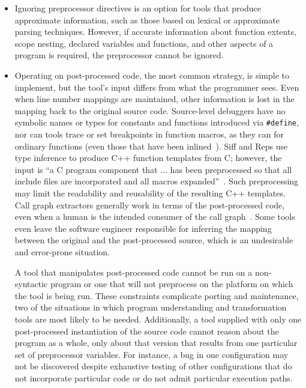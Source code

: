 \documentclass[10pt]{article}
\begin{document}
\begin{itemize}

\item Ignoring preprocessor directives is an option for tools that produce
  approximate information, such as those based on lexical or approximate
  parsing techniques.  However, if accurate information about function
  extents, scope nesting, declared variables and functions, and other
  aspects of a program is required, the preprocessor cannot be ignored.

\item Operating on post-processed code, the most common strategy, is
  simple to implement, but the tool's input differs from what the
  programmer sees.  Even when line number mappings are maintained, other
  information is lost in the mapping back to the original source code.
  Source-level debuggers have no symbolic names or types for constants and
  functions introduced via {\tt \#define}, nor can tools trace or set
  breakpoints in function macros, as they can for ordinary functions (even
  those that have been inlined~\cite{Zellweger83:TR}).  Siff and Reps use
  type inference to produce C++ function templates from C; however, the
  input is ``a C program component that $\ldots$ has been preprocessed so
  that all include files are incorporated and all macros
  expanded''~\cite[p.~145]{Siff-fse96}.  Such preprocessing may limit the
  readability and reusability of the resulting C++ templates.  Call graph
  extractors generally work in terms of the post-processed code, even when
  a human is the intended consumer of the call graph~\cite{Murphy-icse18}.
  Some tools even leave the software engineer responsible for inferring the
  mapping between the original and the post-processed source, which is an
  undesirable and error-prone situation.
  
  A tool that manipulates post-processed code cannot be run on a
  non-syntactic program or one that will not preprocess on the platform on
  which the tool is being run.  These constraints complicate porting and
  maintenance, two of the situations in which program understanding and
  transformation tools are most likely to be needed.  Additionally, a tool
  supplied with only one post-processed instantiation of the source code
  cannot reason about the program as a whole, only about that version that
  results from one particular set of preprocessor variables.  For instance,
  a bug in one configuration may not be discovered despite exhaustive
  testing of other configurations that do not incorporate particular code
  or do not admit particular execution paths.


\end{itemize}
\end{document}
